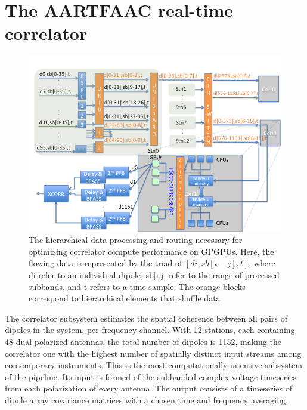 \documentclass{ws-jai}
\begin{document}
\section {\label{sec:gpucorr} The AARTFAAC real-time correlator}
\begin{figure}[htbp]
\centering
\includegraphics[width=1\textwidth]{Figs/data_routing_transform_hierarchy/Slide1.png}
\caption{The hierarchical  data processing and routing  necessary for optimizing
  correlator  compute  performance   on  GPGPUs.  Here,  the   flowing  data  is
  represented by the triad of $[di,sb[i-j],t]$, where di refer to an individual
  dipole, sb[i-j] refer  to the range of  processed subbands, and t  refers to a
  time  sample.  The orange  blocks  correspond  to hierarchical  elements  that
  shuffle data }
\label{fig:afaac_station_hw}
\end{figure}

The correlator  subsystem estimates the  spatial coherence between all  pairs of
dipoles in the system, per frequency  channel. With 12 stations, each containing
48 dual-polarized  antennas, the  total number  of dipoles  is 1152,  making the
correlator one with the highest number of spatially distinct input streams among
contemporary instruments.  This is  the most computationally intensive subsystem
of  the  pipeline.   Its  input  is formed  of  the  subbanded  complex  voltage
timeseries from  each polarization of every  antenna.  The output consists  of a
timeseries of dipole array covariance matrices  with a chosen time and frequency
averaging.
\end{document}
